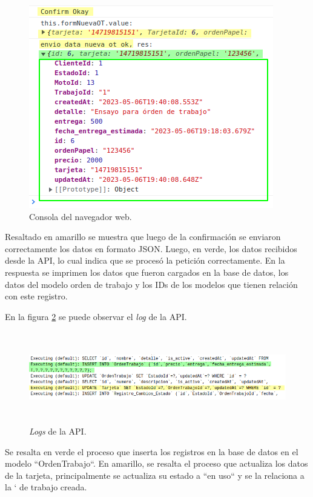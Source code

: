 \begin{figure}[H]
	\centering
	\includegraphics[scale=1.1]{./Figures/ensayo-1/10.nueva-res.png}
	\caption{Consola del navegador web.}
	\label{fig:ensayonueva10}
\end{figure}

Resaltado en amarillo se muestra que luego de la confirmación se enviaron correctamente los datos en formato JSON. Luego, en verde, los datos recibidos desde la API, lo cual indica que se procesó la petición correctamente. En la respuesta se imprimen los datos que fueron cargados en la base de datos, los datos del modelo orden de trabajo y los IDs de los modelos que tienen relación con este registro.

En la figura \ref{fig:ensayonueva10-2} se puede observar el \textit{log} de la API.

\begin{figure}[H]
	\centering
	\includegraphics[width=\textwidth, height=4cm]{./Figures/ensayo-1/10.nueva-api-log.png}
	\caption{\textit{Logs} de la API.}
	\label{fig:ensayonueva10-2}
\end{figure}

Se resalta en verde el proceso que inserta los registros en la base de datos en el modelo ``OrdenTrabajo``. En amarillo, se resalta el proceso que actualiza los datos de la tarjeta, principalmente se actualiza su estado a ``en uso`` y se la relaciona a la ` de trabajo creada.

